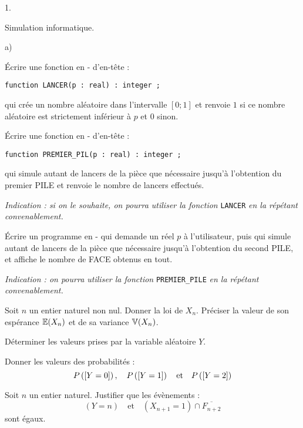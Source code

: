 \documentclass[11pt]{article}%
\begin{document}
\begin{noliste}{1.}
 \setlength{\itemsep}{4mm}
\item Simulation informatique.
\begin{noliste}{a)}
 \setlength{\itemsep}{2mm}
\item Écrire une fonction en -\Scilab{} d'en-tête : 
\begin{center} \texttt{function LANCER(p : real) : integer ;}
\end{center}
qui crée un nombre aléatoire dans l'intervalle $[0;1]$ et renvoie $1$
si ce nombre aléatoire est strictement inférieur à $p$ et $0$ sinon.

\item Écrire une fonction en -\Scilab{} d'en-tête : 
\begin{center} \texttt{function PREMIER\_{P}IL\E(p : real) : integer ;}
\end{center}
qui simule autant de lancers de la pièce que nécessaire jusqu'à
l'obtention du premier PILE et renvoie le nombre de lancers effectués.

\textit{Indication : si on le souhaite, on pourra utiliser la fonction
}\texttt{LANCER}\textit{ en la répétant convenablement.}

\item Écrire un programme en -\Scilab{} qui demande un réel $p$ à
l'utilisateur, puis qui simule autant de lancers de la pièce que
nécessaire jusqu'à l'obtention du second PILE, et affiche le nombre de
FACE obtenus en tout.

\textit{Indication : on pourra utiliser la fonction
}\texttt{PREMIER\_{P}ILE}\textit{ en la répétant convenablement.}
\end{noliste}

\item Soit $n$ un entier naturel non nul. Donner la loi de $X_{n}$.
Préciser la valeur de son espérance $\mathbb{E}(X_{n})$ et de sa variance
$\mathbb{V}(X_{n})$.

\item Déterminer les valeurs prises par la variable aléatoire $Y$.

\item Donner les valeurs des probabilités : 
\[
 P\left(\left[ {Y = 0} \right]\right),\quad P\left(\left[ {Y = 1} \right]\right) \quad
\text{et}\quad P\left(\left[ {Y = 2} \right]\right) 
\]

\item Soit $n$ un entier naturel. Justifier que les évènements :
\[
 (Y = n) \quad\text{et}\quad (X_{n + 1} = 1)\cap \overline{F_{n + 2}} 
\]
sont égaux.


\end{noliste}
\end{document}
